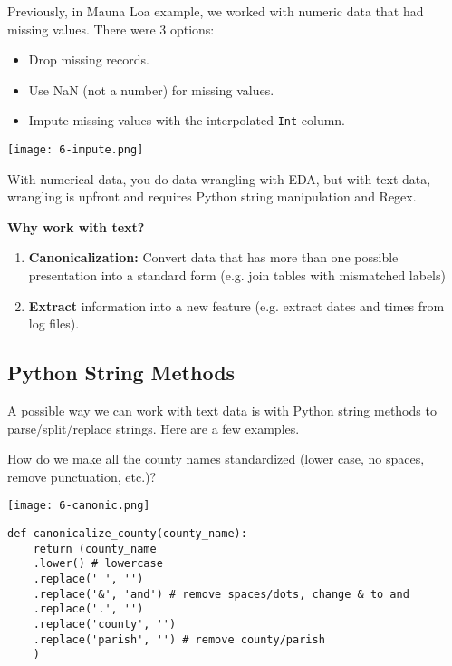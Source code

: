 
Previously, in Mauna Loa example, we worked with numeric data that had missing values. There were 3 options:
\begin{itemize}
\item Drop missing records.
\item Use NaN (not a number) for missing values.
\item Impute missing values with the interpolated \texttt{Int} column.
\end{itemize}
\begin{center}
\texttt{[image: 6-impute.png]}
\end{center}

With numerical data, you do data wrangling with EDA, but with text data, wrangling is upfront and requires Python string manipulation and Regex.

\textbf{Why work with text?}
\begin{enumerate}
    \item \textbf{Canonicalization:} Convert data that has more than one possible presentation into a standard form (e.g. join tables with mismatched labels)
\item \textbf{Extract} information into a new feature (e.g. extract dates and times from log files).
\end{enumerate}

\subsection{Python String Methods}
A possible way we can work with text data is with Python string methods to parse/split/replace strings. Here are a few examples.
\begin{example}[Canonicalization]{How do we make all the county names standardized (lower case, no spaces, remove punctuation, etc.)?
\begin{center}
\texttt{[image: 6-canonic.png]}
\end{center}
\tcbline 
\begin{verbatim}
def canonicalize_county(county_name):
    return (county_name
    .lower() # lowercase
    .replace(' ', '')
    .replace('&', 'and') # remove spaces/dots, change & to and
    .replace('.', '')
    .replace('county', '')
    .replace('parish', '') # remove county/parish
    )
\end{verbatim}
}
\end{example}

